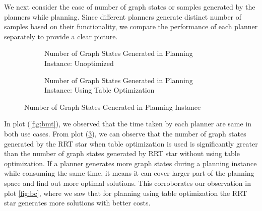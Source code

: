 We next consider the case of number of graph states or samples generated by the planners while planning. Since different planners generate distinct number of samples based on their functionality, we compare the performance of each planner separately to provide a clear picture.

\begin{figure}[!htbp] %
	\centering
	\begin{subfigure}[b]{0.4\textwidth}
		\caption{Number of Graph States Generated in Planning Instance: Unoptimized}
		\label{fig:gsrrt1}
	\end{subfigure}
	\begin{subfigure}[b]{0.4\textwidth}
		\caption{Number of Graph States Generated in Planning Instance: Using Table Optimization}
		\label{fig:gsrrt2}
	\end{subfigure}	
	\caption{Number of Graph States Generated in Planning Instance}
	\label{fig:gsrrt}
\end{figure}

In plot (\ref{fig:bmt}), we observed that the time taken by each planner are same in both use cases. From plot (\ref{fig:gsrrt}), we can observe that the number of graph states generated by the RRT star when table optimization is used is significantly greater than the number of graph states generated by RRT star without using table optimization. If a planner generates more graph states during a planning instance while consuming the same time, it means it can cover larger part of the planning space and find out more optimal solutions. This corroborates our observation in plot \ref{fig:bc}, where we saw that for planning using table optimization the RRT star generates more solutions with better costs. 
